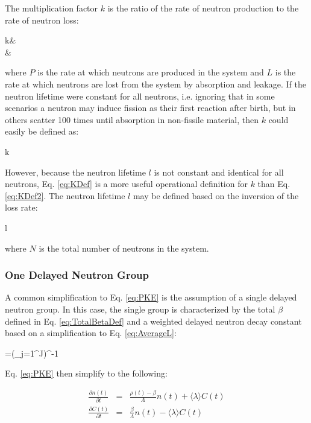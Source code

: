 The multiplication factor \(k\) is the ratio of the rate of neutron production to the rate of neutron loss:

\beqa
\label{eq:KDef}
k\equiv&\\
\equiv&
\eeqa

where \(P\) is the rate at which neutrons are produced in the system and \(L\) is the rate at which neutrons are lost from the system by absorption and leakage. If the neutron lifetime were constant for all neutrons, i.e. ignoring that in some scenarios a neutron may induce fission as their first reaction after birth, but in others scatter 100 times until absorption in non-fissile material, then \(k\) could easily be defined as:

\beq
\label{eq:KDef2}
k\equiv{}
\eeq

However, because the neutron lifetime \(l\) is not constant and identical for all neutrons, Eq. \eqref{eq:KDef} is a more useful operational definition for \(k\) than Eq. \eqref{eq:KDef2}. The neutron lifetime \(l\) may be defined based on the inversion of the loss rate:

\beq
\label{eq:NeutronLifetime}
l\equiv{}
\eeq

where \(N\) is the total number of neutrons in the system.

\subsubsection{One Delayed Neutron Group}
\label{sec:OneDelayedGroup}
A common simplification to Eq. \eqref{eq:PKE} is the assumption of a single delayed neutron group. In this case, the single group is characterized by the total \(\beta\) defined in Eq. \eqref{eq:TotalBetaDef} and a weighted delayed neutron decay constant based on a simplification to Eq. \eqref{eq:AverageL}:

\beq
\langle\lambda\rangle=\left(\sum_{j=1}^J\right)^{-1}
\eeq

Eq. \eqref{eq:PKE} then simplify to the following:

\begin{subequations}
\label{eq:PKE2}
\begin{eqnarray}
\frac{\partial n(t)}{\partial t}&=&\frac{\rho(t)-\beta}{\Lambda}n(t)+\langle\lambda\rangle C(t)\\
\frac{\partial C(t)}{\partial t}&=&\frac{\beta}{\Lambda}n(t)-\langle\lambda\rangle C(t)
\end{eqnarray}
\end{subequations}

